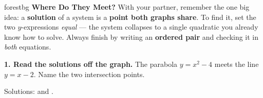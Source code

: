 \documentclass[10pt]{article}
\newcommand{\lgrid}[4]{%
  \draw[step=1, linegray!40, very thin] (#1,#3) grid (#2,#4);
  \draw[->, semithick, charcoal] (#1,0)--(#2,0) node[below right, font=\scriptsize]{$x$};
  \draw[->, semithick, charcoal] (0,#3)--(0,#4) node[left, font=\scriptsize]{$y$};}
\begin{document}

\vspace{0.08in}

\begin{headlinebox}{forestbg}
\small\textbf{Where Do They Meet?} With your partner, remember the one big idea: a \textbf{solution} of a system is
a \textbf{point both graphs share}. To find it, set the two $y$-expressions \emph{equal} --- the system collapses
to a single quadratic you already know how to solve. Always finish by writing an \textbf{ordered pair} and checking
it in \emph{both} equations.
\end{headlinebox}

\vspace{0.06in}

\begin{tcolorbox}[colback=white, colframe=black!40, title=\textbf{Tier R --- Remediate},
    fonttitle=\bfseries, arc=1.5mm, left=3mm, right=3mm, top=2mm, bottom=2mm, breakable]
\textbf{1. Read the solutions off the graph.} The parabola $y=x^2-4$ meets the line $y=x-2$. Name the two
intersection points.
\begin{center}
\end{center}
Solutions: \blank{2.4cm} and \blank{2.4cm}.


\end{tcolorbox}
\end{document}
